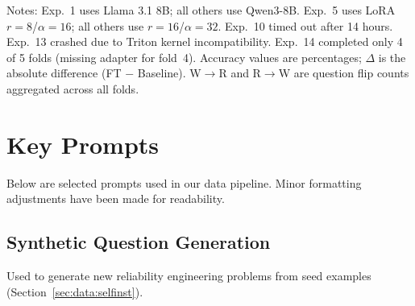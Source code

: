 \begin{table}[t]
\centering
\caption{GRPO experiment log. All models are Qwen3-8B (4-bit) with 200 useful steps, $G=4$ generations, grad\_accum=4. Accuracy is on the 266 mixed questions unless noted.}
\label{tab:grpo_exp_log}
\end{table}


Notes: Exp.~1 uses Llama 3.1 8B; all others use Qwen3-8B. Exp.~5 uses LoRA $r=8$/$\alpha=16$; all others use $r=16$/$\alpha=32$. Exp.~10 timed out after 14 hours. Exp.~13 crashed due to Triton kernel incompatibility. Exp.~14 completed only 4 of 5 folds (missing adapter for fold~4). Accuracy values are percentages; $\Delta$ is the absolute difference (FT $-$ Baseline). W$\to$R and R$\to$W are question flip counts aggregated across all folds.


\section{Key Prompts}
\label{app:prompts}

Below are selected prompts used in our data pipeline. Minor formatting adjustments have been made for readability.

\subsection{Synthetic Question Generation}
\label{app:prompt:gen}

Used to generate new reliability engineering problems from seed examples (Section~\ref{sec:data:selfinst}).

